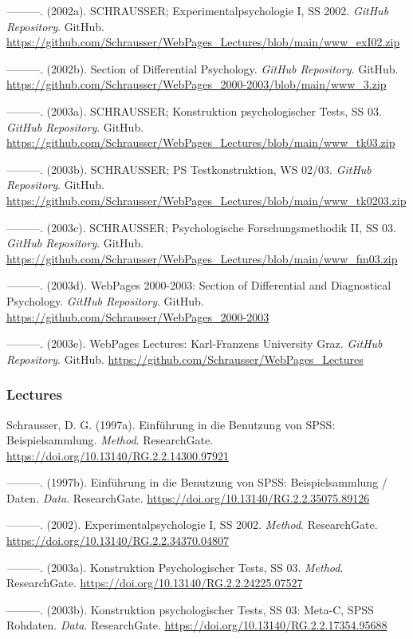 \documentclass[
]{article}
\begin{document}
---------. (2002a). SCHRAUSSER; Experimentalpsychologie I, SS 2002.
\emph{GitHub Repository}. GitHub.
\url{https://github.com/Schrausser/WebPages_Lectures/blob/main/www_exI02.zip}

---------. (2002b). Section of Differential Psychology. \emph{GitHub
Repository}. GitHub.
\url{https://github.com/Schrausser/WebPages_2000-2003/blob/main/www_3.zip}

---------. (2003a). SCHRAUSSER; Konstruktion psychologischer Tests, SS
03. \emph{GitHub Repository}. GitHub.
\url{https://github.com/Schrausser/WebPages_Lectures/blob/main/www_tk03.zip}

---------. (2003b). SCHRAUSSER; PS Testkonstruktion, WS 02/03.
\emph{GitHub Repository}. GitHub.
\url{https://github.com/Schrausser/WebPages_Lectures/blob/main/www_tk0203.zip}

---------. (2003c). SCHRAUSSER; Psychologische Forschungsmethodik II, SS
03. \emph{GitHub Repository}. GitHub.
\url{https://github.com/Schrausser/WebPages_Lectures/blob/main/www_fm03.zip}

---------. (2003d). WebPages 2000-2003: Section of Differential and
Diagnostical Psychology. \emph{GitHub Repository}. GitHub.
\url{https://github.com/Schrausser/WebPages_2000-2003}

---------. (2003e). WebPages Lectures: Karl-Franzens University Graz.
\emph{GitHub Repository}. GitHub.
\url{https://github.com/Schrausser/WebPages_Lectures}

\hypertarget{lectures}{%
\subsubsection{Lectures}\label{lectures}}

Schrausser, D. G. (1997a). Einführung in die Benutzung von SPSS:
Beispielsammlung. \emph{Method}. ResearchGate.
\url{https://doi.org/10.13140/RG.2.2.14300.97921}

---------. (1997b). Einführung in die Benutzung von SPSS:
Beispielsammlung / Daten. \emph{Data}. ResearchGate.
\url{https://doi.org/10.13140/RG.2.2.35075.89126}

---------. (2002). Experimentalpsychologie I, SS 2002. \emph{Method}.
ResearchGate. \url{https://doi.org/10.13140/RG.2.2.34370.04807}

---------. (2003a). Konstruktion Psychologischer Tests, SS 03.
\emph{Method}. ResearchGate.
\url{https://doi.org/10.13140/RG.2.2.24225.07527}

---------. (2003b). Konstruktion psychologischer Tests, SS 03: Meta-C,
SPSS Rohdaten. \emph{Data}. ResearchGate.
\url{https://doi.org/10.13140/RG.2.2.17354.95688}
\end{document}
